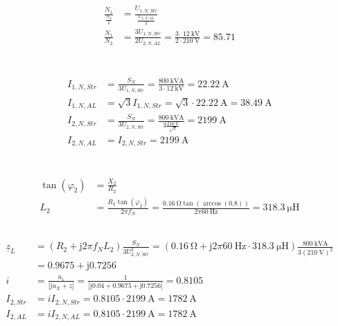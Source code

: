 \documentclass[11pt,a4paper]{scrartcl}
\newcommand{\mybr}[1]{\left(#1\right)}
\renewcommand{\j}{\mathrm{j}}
\newcommand{\z}{\underline{z}}
\newcommand{\0}{_{\mybr{0}}}
\newcommand{\1}{_{\mybr{1}}}
\newcommand{\2}{_{\mybr{2}}}
\newcommand{\ISS}{I_{2,Str}}
\newcommand{\ISA}{I_{2,AL}}
\newcommand{\UPNS}{U_{1,N,Str}}
\newcommand{\USNS}{U_{2,N,Str}}
\newcommand{\USNA}{U_{2,N,AL}}
\newcommand{\IPNS}{I_{1,N,Str}}
\newcommand{\ISNS}{I_{2,N,Str}}
\newcommand{\IPNA}{I_{1,N,AL}}
\newcommand{\ISNA}{I_{2,N,AL}}
\begin{document}
\section{}
\begin{align}
\frac{N_1}{\frac{N_2}{2}}&=\frac{\UPNS}{\frac{\USNA}{3}}\\
\frac{N_1}{N_2}&=\frac{3\UPNS}{2\USNA}=\frac{3\cdot\SI{12}{\kilo\volt}}{2\cdot\SI{210}{\volt}}=\num{85.71}
\end{align}

\section{}
\begin{align}
\IPNS&=\frac{S_N}{3\UPNS}=\frac{\SI{800}{\kilo\volt\ampere}}{3\cdot\SI{12}{\kilo\volt}}=\SI{22.22}{\ampere}\\
\IPNA&=\sqrt{3}\IPNS=\sqrt{3}\cdot\SI{22.22}{\ampere}=\SI{38.49}{\ampere}\\
\ISNS&=\frac{S_N}{3\USNS}=\frac{\SI{800}{\kilo\volt\ampere}}{3\frac{\SI{210}{\volt}}{\sqrt{3}}}=\SI{2199}{\ampere}\\
\ISNA&=\ISNS=\SI{2199}{\ampere}
\end{align}

\section{}
\subsection{}
\begin{align}
\tan\mybr{\varphi_2}&=\frac{X_2}{R_2}\\
L_2&=\frac{R_2\tan\mybr{\varphi_2}}{2\pi f_N}=\frac{\SI{0.16}{\ohm}\tan\mybr{\arccos\mybr{0.8}}}
{2\pi\SI{60}{\hertz}}=\SI{318.3}{\micro\henry}
\end{align}

\subsection{}
\begin{align}
\z_L&=\mybr{R_2+\j 2\pi f_N L_2}\frac{S_N}{3\USNS^2}=\mybr{\SI{0.16}{\ohm}+\j2\pi\SI{60}{\hertz}\cdot\SI{318.3}{\micro\henry}}\frac{\SI{800}{\kilo\volt\ampere}}{3\mybr{\SI{210}{\volt}}^2}\\
&=\num{0.9675}+\j\num{0.7256}\label{eq:alterWiderstand}\\
i&=\frac{u_1}{\left|\j u_X+\z\right|}=\frac{1}{\left|\j\num{0.04}+\num{0.9675}+\j\num{0.7256}\right|}=\num{0.8105}\\
\ISS&=i\ISNS=\num{0.8105}\cdot\SI{2199}{\ampere}=\SI{1782}{\ampere}\\
\ISA&=i\ISNA=\num{0.8105}\cdot\SI{2199}{\ampere}=\SI{1782}{\ampere}
\end{align}
\end{document}
